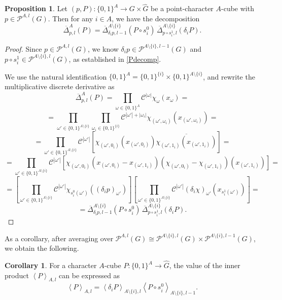 \documentclass{amsart}
\theoremstyle{definition}
\newtheorem{proposition}[theorem]{Proposition}
\newtheorem{corollary}[theorem]{Corollary}
\theoremstyle{remark}
\numberwithin{equation}{section}
\begin{document}
\begin{proposition}
\label{prop:charsplit}
Let $(p,P) : \{0,1\}^A \to G \times \widehat{G}$ be a point-character $A$-cube with \(p \in \mathcal{P}^{A,l}(G)\). Then for any $i \in A$, we have the decomposition
$$ \overline{\Delta}^A_{p,l} (P)  =  \overline{\Delta}^{A \setminus \{i\}}_{\delta_i p,l-1}(P \circ s_i^0 ) \, \overline{\Delta}^{A \setminus \{i\}}_{p \circ s_i^1 ,l} (\delta_i P). $$
\end{proposition}
\begin{proof} Since $p \in  \mathcal{P}^{A,l}(G)$, we know  $\delta_i p \in  \mathcal{P}^{A \setminus \{i\},l-1}(G)$ and $p \circ s_i^1  \in  \mathcal{P}^{A \setminus \{i\},l}(G)$, as established  in \eqref{Pdecomp}.

We use the natural identification $\{0,1\}^A = \{0,1\}^{\{i\} } \times \{0,1\}^{A \setminus \{ i\} }$, and rewrite the multiplicative discrete derivative as
$$  \overline{\Delta}^A_{p,l} (P) = \prod_{\omega \in \{0,1\}^A} \mathcal{C}^{|\omega|} \chi_\omega (x_\omega) = $$
$$ = \prod_{\omega' \in \{0,1\}^{A \setminus \{i\}}} \prod_{\omega_i \in \{0,1\}^{\{i\}}} \mathcal{C}^{|\omega'|+|\omega_i|} \chi_{(\omega', \omega_i)} (x_{(\omega', \omega_i )}) = $$
$$ = 
 \prod_{\omega' \in \{0,1\}^{A \setminus \{i\}}}  \mathcal{C}^{|\omega'|} \left[ \chi_{(\omega', 0_i)} (x_{(\omega', 0_i )}) \overline{\chi_{(\omega', 1_i)} (x_{(\omega', 1_i )})} \right]= $$
 $$= \prod_{\omega' \in \{0,1\}^{A \setminus \{i\}}}  \mathcal{C}^{|\omega'|} \left[ \chi_{(\omega', 0_i)} (x_{(\omega', 0_i)} - x_{(\omega', 1_i)} ) \left(\chi_{(\omega', 0_i)} - \chi_{(\omega', 1_i)}\right) (x_{(\omega', 1_i )}) \right]= 
$$
$$ = \left[\prod_{\omega' \in \{0,1\}^{A \setminus \{i\}}}  \mathcal{C}^{|\omega'|} \chi_{s_i^0(\omega')}((\delta_i p)_{\omega'})\right]  \left[\prod_{\omega' \in \{0,1\}^{A \setminus \{i\}}}  \mathcal{C}^{|\omega'|} (\delta_i\chi)_{\omega'}(x_{s_i^1 (\omega')})\right]=
$$
$$=   \overline{\Delta}^{A \setminus \{i\}}_{\delta_i p,l-1}(P \circ s_i^0  ) \, \overline{\Delta}^{A \setminus \{i\}}_{p \circ s_i^1  ,l} (\delta_i P).$$

\end{proof}

As a corollary, after averaging over $\mathcal{P}^{A,l}(G) \cong  \mathcal{P}^{A\setminus\{i\},l}(G) \times \mathcal{P}^{A\setminus\{i\},l-1}(G)$,  we obtain the following.

\begin{corollary}
\label{cor:split}
For a character $A$-cube  $P : \{0,1\}^A \to \widehat{G}$, the value of the inner product $\left\langle P \right\rangle_{A,l}$ can be expressed as
$$ \left\langle P \right\rangle_{A,l}  = 
\left\langle \delta_i P \right\rangle_{A\setminus \{i\},l} 
\left\langle P \circ s_i^0 \right\rangle_{A \setminus \{i\},l-1}.$$
\end{corollary}
\end{document}
